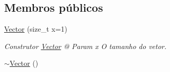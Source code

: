\subsection*{Membros públicos}
\begin{DoxyCompactItemize}
\item 
\hyperlink{class_vector_a882e1f7a7fcb08d248bd2fa3f9869527}{Vector} (size\+\_\+t x=1)\hypertarget{class_vector_a882e1f7a7fcb08d248bd2fa3f9869527}{}\label{class_vector_a882e1f7a7fcb08d248bd2fa3f9869527}

\begin{DoxyCompactList}\small\item\em Construtor \hyperlink{class_vector}{Vector} @ Param x O tamanho do vetor. \end{DoxyCompactList}\item 
\hyperlink{class_vector_a42105d30af4b2da75975561e1aff74c4}{$\sim$\+Vector} ()\hypertarget{class_vector_a42105d30af4b2da75975561e1aff74c4}{}\label{class_vector_a42105d30af4b2da75975561e1aff74c4}


\end{DoxyCompactItemize}
